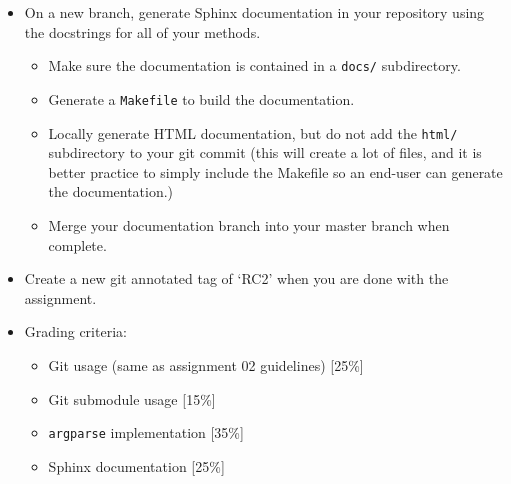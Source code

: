 \begin{itemize}
\item On a new branch, generate Sphinx documentation in your repository using the docstrings for all of your methods.
\begin{itemize}
    \item Make sure the documentation is contained in a \verb+docs/+ subdirectory.
    \item Generate a \verb+Makefile+ to build the documentation.
    \item Locally generate HTML documentation, but do not add the \verb+html/+ subdirectory to your git commit (this will create a lot of files, and it is better practice to simply include the Makefile so an end-user can generate the documentation.)
    \item Merge your documentation branch into your master branch when complete.
\end{itemize}


\item Create a new git annotated tag of `RC2' when you are done with the assignment.

\item Grading criteria:
\begin{itemize}
    \item Git usage (same as assignment 02 guidelines) [25\%]
    \item Git submodule usage [15\%]
    \item \verb+argparse+ implementation [35\%]
    \item Sphinx documentation [25\%]
\end{itemize}




\end{itemize}


